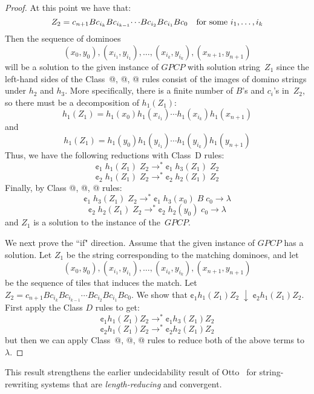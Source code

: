 \documentclass{lmcs} %
\makeatletter
\theoremstyle{plain}\newtheorem{satz}[thm]{Satz} %
\newcommand*{\rom}[1]{\expandafter\@slowromancap\romannumeral #1@}
\makeatother
\begin{document}
\begin{proof}
At this point we have that:
\[ Z_2 = c_{n+1}Bc_{i_k}Bc_{i_{k-1}}{\cdots}Bc_{i_2}Bc_{i_1}Bc_0 \text{\:\:\: for
some } i_1, \ldots, i_k\] Then the sequence of dominoes
\[(x_0, y_0), (x_{i_1}, y_{i_1}), {\ldots} , (x_{i_k}, y_{i_k}),
(x_{n+1}, y_{n+1}) \] will be a solution to the given instance of
$GPCP$ with solution string~$Z_1$ since the left-hand sides of the
Class~\rom{1}, \rom{2}, \rom{3} rules consist of the images of domino
strings under $h_2$ and $h_3$. More specifically, there is a finite
number of $B$'s and $c_i$'s in~$Z_2$, so there must be a decomposition
of $h_1(Z_1)$:
\[ h_1(Z_1) = h_1(x_0)h_1(x_{i_1}) \cdots h_1(x_{i_k})h_1(x_{n+1}) \]
and
\[ h_1(Z_1) = h_1(y_0)h_1(y_{i_1}) \cdots h_1(y_{i_k})h_1(y_{n+1}) \]
Thus, we have the following reductions with Class~D rules:
\[ \cent_1\;h_1(Z_1)\;Z_2 \rightarrow^{*} \cent_1\;h_3(Z_1)\;Z_2 \]
\[ \cent_2\;h_1(Z_1)\;Z_2 \rightarrow^{*} \cent_2\;h_2(Z_1)\;Z_2 \]
Finally, by Class \rom{1}, \rom{2}, \rom{3} rules:
\[\cent_1\;h_3(Z_1)\;Z_2 \rightarrow^{*} \cent_1\; h_3(x_0)\;B\;c_0
\rightarrow \lambda \]
\[\cent_2\;h_2(Z_1)\;Z_2 \rightarrow^{*} \cent_2\; h_2(y_0)\;c_0
\rightarrow \lambda \] and $Z_1$ is a solution to the instance of
the~$GPCP$.

We next prove the ``if" direction. Assume that the given instance of
$GPCP$ has a solution. Let $Z_1$ be the string corresponding to the
matching dominoes, and let
\[(x_0, y_0), (x_{i_1}, y_{i_1}), {\ldots} , (x_{i_k}, y_{i_k}),
(x_{n+1}, y_{n+1}) \] be the sequence of tiles that induces the match.
Let $Z_2 = c_{n+1}Bc_{i_k}Bc_{i_{k-1}}{\cdots}Bc_{i_2}Bc_{i_1}Bc_0$. We show that
$\cent_1 h_1(Z_1)Z_2\; \downarrow\; \cent_2 h_1(Z_1)Z_2$.  First apply the
Class $D$ rules to get:
\[ {\cent_1}h_1(Z_1)Z_2 \rightarrow^{*} {\cent_1}h_3(Z_1)Z_2 \]
\[ {\cent_2}h_1(Z_1)Z_2 \rightarrow^{*} {\cent_2}h_2(Z_1)Z_2 \] but then we
can apply Class~\rom{1}, \rom{2}, \rom{3} rules to reduce both of the
above terms to $\lambda$.
\end{proof}

This result strengthens the earlier undecidability result of
Otto~\cite{Otto1986} for string-rewriting systems that are
\emph{length-reducing} and convergent.


\end{document}
